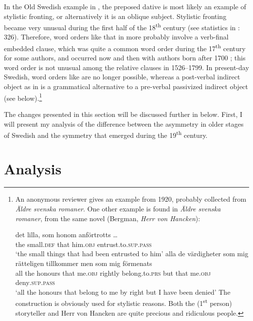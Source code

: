 \documentclass[output=paper]{langscibook}
\begin{document}
In the Old Swedish example in , the preposed dative is most likely an example of stylistic fronting, or alternatively it is an oblique subject. Stylistic fronting became very unusual during the first half of the 18\textsuperscript{th} century (see statistics in \citealt{Falk1993}: 326). Therefore, word orders like that in  more probably involve a verb-final embedded clause, which was quite a common word order during the 17\textsuperscript{th} century for some authors, and occurred now and then with authors born after 1700 \citep{Platzack1983}; this word order is not unusual among the relative clauses in 1526–1799. In present-day Swedish, word orders like  are no longer possible, whereas a post-verbal indirect object as in  is a grammatical alternative to a pre-verbal passivized indirect object (see  below).\footnote{An anonymous reviewer gives an example from 1920, probably collected from \textit{Äldre svenska romaner}. One other example is found in \textit{Äldre svenska romaner}, from the same novel (Bergman, \textit{Herr von Hancken}):

\ea \gll det  lilla,    som  honom    anförtrotts …\\
        the  small.\textsc{def}  that  him.\textsc{obj}  entrust.to.\textsc{sup.pass}\\
        \glt  ‘the small things that had been entrusted to him’
\ex  \gll alla de  värdigheter  som  mig    rätteligen  tillkommer    men  som  mig    förmenats\\
         all the  honours    that  me.\textsc{obj}  rightly    belong.to.\textsc{prs}  but  that  me.\textsc{obj}  deny\textsc{.sup.pass}\\
       \glt ‘all the honours that belong to me by right but I have been denied’
\z The construction is obviously used for stylistic reasons. Both the (1\textsuperscript{st} person) storyteller and Herr von Hancken are quite precious and ridiculous people.}


The changes presented in this section will be discussed further in  below. First, I will present my analysis of the difference between the asymmetry in older stages of Swedish and the symmetry that emerged during the 19\textsuperscript{th} century.

\section{Analysis}\label{sec:falk:4}
\end{document}
